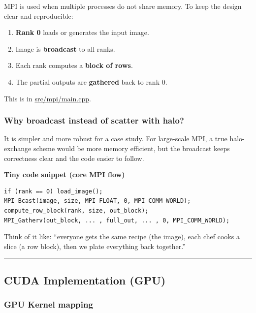 \documentclass[
]{article}
\providecommand{\tightlist}{%
  \setlength{\itemsep}{0pt}\setlength{\parskip}{0pt}}
\begin{document}
MPI is used when multiple processes do not share memory. To keep the
design clear and reproducible:

\begin{enumerate}
\def\labelenumi{\arabic{enumi}.}
\tightlist
\item
  \textbf{Rank 0} loads or generates the input image.
\item
  Image is \textbf{broadcast} to all ranks.
\item
  Each rank computes a \textbf{block of rows}.
\item
  The partial outputs are \textbf{gathered} back to rank 0.
\end{enumerate}

This is in \url{src/mpi/main.cpp}.

\subsubsection{Why broadcast instead of scatter with
halo?}\label{why-broadcast-instead-of-scatter-with-halo}

It is simpler and more robust for a case study. For large-scale MPI, a
true halo-exchange scheme would be more memory efficient, but the
broadcast keeps correctness clear and the code easier to follow.

\textbf{Tiny code snippet (core MPI flow)}

\begin{verbatim}
if (rank == 0) load_image();
MPI_Bcast(image, size, MPI_FLOAT, 0, MPI_COMM_WORLD);
compute_row_block(rank, size, out_block);
MPI_Gatherv(out_block, ... , full_out, ... , 0, MPI_COMM_WORLD);
\end{verbatim}

Think of it like: ``everyone gets the same recipe (the image), each chef
cooks a slice (a row block), then we plate everything back together.''

\begin{center}\rule{0.5\linewidth}{0.5pt}\end{center}

\subsection{CUDA Implementation (GPU)}\label{cuda-implementation-gpu}

\subsubsection{GPU Kernel mapping}\label{gpu-kernel-mapping}
\end{document}
